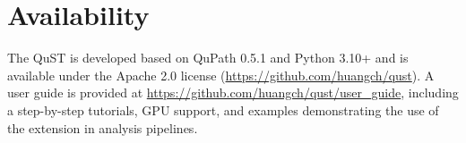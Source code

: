 \documentclass{article}
\begin{document}
\section{Availability}

The QuST is developed based on QuPath 0.5.1 and Python 3.10+ and is available under the Apache 2.0 license (\url{https://github.com/huangch/qust}). A user guide is provided at \url{https://github.com/huangch/qust/user_guide}, including a step-by-step tutorials, GPU support, and examples demonstrating the use of the extension in analysis pipelines.


\end{document}
